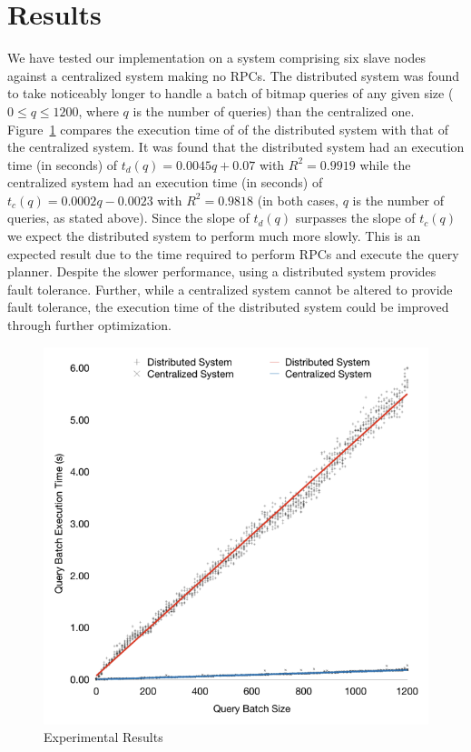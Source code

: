 \section{Results}
We have tested our implementation on a system comprising six slave nodes
against a centralized system making no RPCs. The distributed system was found
to take noticeably longer to handle a batch of bitmap queries of any given size
(\(0 \leq q \leq 1200\), where \(q\) is the number of queries) than the
centralized one. Figure~\ref{fig:graph-of-results} compares the execution time
of of the distributed system with that of the centralized system. It was found
that the distributed system had an execution time (in seconds) of
\(t_d(q) = 0.0045q + 0.07\) with \(R^2 = 0.9919\) while the centralized system
had an execution time (in seconds) of \(t_c(q) = 0.0002q - 0.0023\) with
\(R^2 = 0.9818\) (in both cases, \(q\) is the number of queries, as stated
above). Since the slope of \(t_d(q)\) surpasses the slope of \(t_c(q)\) we
expect the distributed system to perform much more slowly. This is an expected
result due to the time required to perform RPCs and execute the query planner.
Despite the slower performance, using a distributed system provides fault
tolerance. Further, while a centralized system cannot be altered to provide
fault tolerance, the execution time of the distributed system could be improved
through further optimization.
%
\begin{figure}
    \centering
    \includegraphics[width=\columnwidth]{query-experiment-results}
    \caption{Experimental Results}\label{fig:graph-of-results}
\end{figure}
